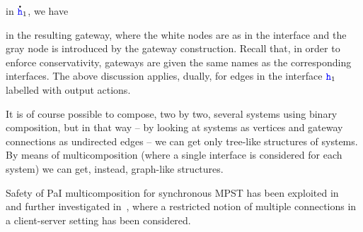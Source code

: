   in $\accentset{\mbox{\large\bfseries .}}{{ \ensuremath{\mathtt{\color{blue}{ {h}}}} }}_1$, we have
  \raisebox{2mm}
{
 }
in the resulting gateway, where the white nodes are as in the interface  and the gray node is introduced by the gateway construction.
Recall that, in order to enforce conservativity, gateways are given the same names as the
corresponding interfaces.
The above discussion applies, dually, for edges in the interface ${\mathtt{\color{blue}{ {h}}}}_1$ labelled with output actions.

It is of course possible to compose, two by two, several systems using binary composition,
but in that way -- by looking at systems as vertices and gateway connections as undirected edges  -- we can get only tree-like structures of systems. By means of multicomposition
(where a single interface is considered for each system) we can get, instead, graph-like structures. 

Safety of PaI multicomposition for synchronous  MPST has been exploited in~\cite{BDGY23} 
and further investigated in~\cite{BDL22,BBD25}, where a restricted  notion of multiple connections in a client-server setting has been considered.







%
%
%
%

